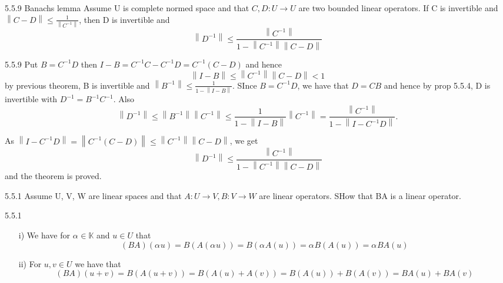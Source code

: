 \documentclass[a4paper,norsk]{article}
\renewcommand{\leq}{\leqslant}
\begin{document}
\begin{theorembox}{5.5.9 Banachs lemma}{}
Assume U is complete normed space and that $ C, D : U \to U $ are two bounded linear operators. If C is invertible and $ \left\lVert C - D \right\rVert \leq \frac{ 1 }{ \left\lVert C ^{-1}  \right\rVert  } $, then D is invertible and
\[
    \left\lVert D ^{-1}  \right\rVert \leq  \frac{ \left\lVert C ^{-1}  \right\rVert  }{ 1 - \left\lVert C ^{-1}  \right\rVert \left\lVert C - D \right\rVert   }
\]

\begin{proofbox}{5.5.9}{}
    Put $ B = C ^{-1} D  $ then $ I - B =  C ^{-1} C - C ^{-1} D  = C ^{-1} \left( C - D \right)    $ and hence
    \[
        \left\lVert I - B \right\rVert \leq \left\lVert C ^{-1}  \right\rVert \left\lVert C - D \right\rVert < 1
    \]
    by previous theorem, B is invertible and $ \left\lVert B ^{-1}   \right\rVert \leq \frac{ 1 }{ 1 - \left\lVert I - B \right\rVert  }  $. SInce $ B = C ^{-1} D  $, we have that $ D = CB $ and hence by prop 5.5.4, D is invertible with $ D ^{-1} = B ^{-1} C ^{-1}    $. Also
    \[
        \left\lVert D ^{-1}  \right\rVert \leq \left\lVert B ^{-1} \right\rVert  \left\lVert C ^{-1}  \right\rVert \leq \frac{ 1 }{ 1 - \left\lVert I - B \right\rVert  } \left\lVert C ^{-1}  \right\rVert = \frac{ \left\lVert C ^{-1}  \right\rVert  }{ 1 - \left\lVert I - C ^{-1} D  \right\rVert  }.
    \]
    
    As $ \left\lVert I - C ^{-1} D  \right\rVert = \left\lVert C ^{-1} \left( C - D \right)   \right\rVert \leq \left\lVert C ^{-1}   \right\rVert \left\lVert C - D \right\rVert    $, we get
    \[
        \left\lVert D ^{-1}  \right\rVert \leq \frac{ \left\lVert C ^{-1}  \right\rVert  }{ 1 - \left\lVert C ^{-1}  \right\rVert \left\lVert C - D \right\rVert   }
    \]
    and the theorem is proved.
\end{proofbox}
\end{theorembox}


\begin{oppgavebox}{5.5.1}{}
Assume U, V, W are linear spaces and that $ A : U \to V, B : V \to W $ are linear operators. SHow that BA is a linear operator.

\begin{proofbox}{5.5.1}{}
    \begin{itemize}
        \item[i)] We have for $ \alpha_{}^{} \in \mathbb{K}  $ and $ u \in U $ that
        \[
            \left( BA \right) \left( \alpha_{}^{} u \right) = B \left( A \left( \alpha_{}^{} u \right)  \right) = B \left( \alpha_{}^{} A (u) \right) = \alpha_{}^{} B \left( A(u) \right) = \alpha_{}^{} BA(u)
        \]
        \item[ii)] For $ u, v \in U $ we have that
        \[
            \left( BA \right) \left( u+v \right) = B \left( A \left( u+v \right)  \right) = B \left( A(u) + A(v) \right) = B (A(u)) + B(A(v)) = BA(u) + BA(v)
        \]
    \end{itemize}
\end{proofbox}
\end{oppgavebox}
\end{document}
